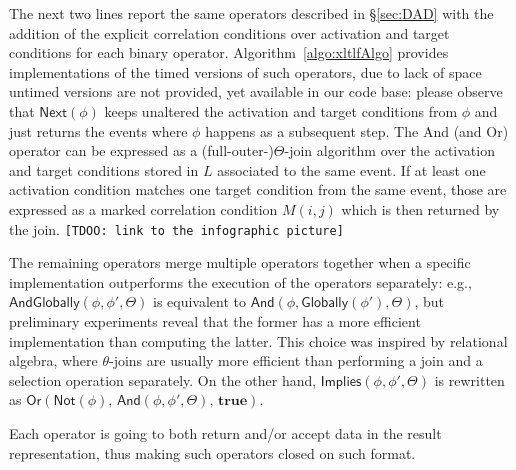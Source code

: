 The next two lines report the same operators described in \S\ref{sec:DAD} with the addition of the explicit correlation conditions over activation and target conditions for each binary operator. Algorithm~\ref{algo:xltlfAlgo} provides  implementations of the timed versions of such operators, due to lack of space untimed versions are not provided, yet available in our code base: please observe that $\textsf{Next}(\phi)$ keeps unaltered the activation and target conditions from $\phi$ and just returns the events where $\phi$ happens as a subsequent step. The \textsf{And} (and \textsf{Or}) operator can be expressed as a (full-outer-)$\Theta$-join algorithm over the activation and target conditions stored in $L$ associated to the same event. If at least one activation condition matches one target condition from the same event, those are expressed as a marked correlation condition $M(i,j)$ which is then returned by the join. \texttt{\color{red}[TDOO: link to the infographic picture]}


The remaining operators merge multiple operators together when %
a specific implementation outperforms%
the execution of the operators separately:
 e.g., $\textsf{AndGlobally}(\phi,\phi',\Theta)$ is equivalent to $\textsf{And}(\phi,\textsf{Globally}(\phi'),\Theta)$, but preliminary experiments reveal that the former has a more efficient implementation than computing the latter. This choice was inspired by relational algebra, where $\theta$-joins are usually more efficient than performing a join and a selection operation separately.
 On the other hand, %
 $\textsf{Implies}(\phi,\phi',\Theta)$ is rewritten as $\textsf{Or}(\textsf{Not}(\phi),\,\textsf
{And}(\phi,\phi',\Theta),\,\textbf{true})$.


Each \xLTLf operator is going to both return and/or accept data in the result representation, thus making such operators closed on such format.






